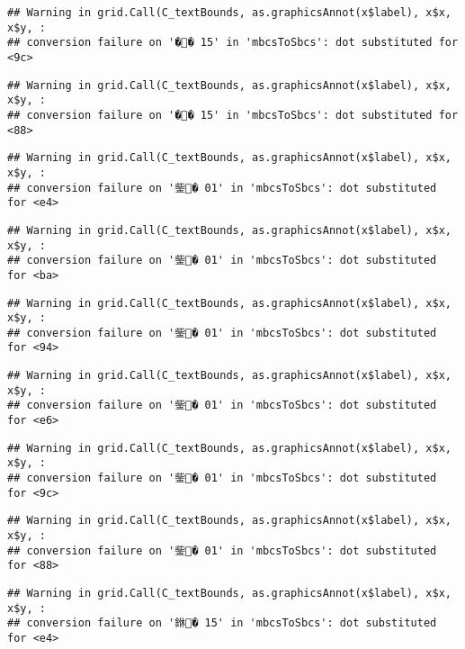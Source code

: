 \documentclass[]{article}
\begin{document}
\begin{verbatim}
## Warning in grid.Call(C_textBounds, as.graphicsAnnot(x$label), x$x, x$y, :
## conversion failure on '�� 15' in 'mbcsToSbcs': dot substituted for <9c>
\end{verbatim}

\begin{verbatim}
## Warning in grid.Call(C_textBounds, as.graphicsAnnot(x$label), x$x, x$y, :
## conversion failure on '�� 15' in 'mbcsToSbcs': dot substituted for <88>
\end{verbatim}

\begin{verbatim}
## Warning in grid.Call(C_textBounds, as.graphicsAnnot(x$label), x$x, x$y, :
## conversion failure on '鈭� 01' in 'mbcsToSbcs': dot substituted for <e4>
\end{verbatim}

\begin{verbatim}
## Warning in grid.Call(C_textBounds, as.graphicsAnnot(x$label), x$x, x$y, :
## conversion failure on '鈭� 01' in 'mbcsToSbcs': dot substituted for <ba>
\end{verbatim}

\begin{verbatim}
## Warning in grid.Call(C_textBounds, as.graphicsAnnot(x$label), x$x, x$y, :
## conversion failure on '鈭� 01' in 'mbcsToSbcs': dot substituted for <94>
\end{verbatim}

\begin{verbatim}
## Warning in grid.Call(C_textBounds, as.graphicsAnnot(x$label), x$x, x$y, :
## conversion failure on '鈭� 01' in 'mbcsToSbcs': dot substituted for <e6>
\end{verbatim}

\begin{verbatim}
## Warning in grid.Call(C_textBounds, as.graphicsAnnot(x$label), x$x, x$y, :
## conversion failure on '鈭� 01' in 'mbcsToSbcs': dot substituted for <9c>
\end{verbatim}

\begin{verbatim}
## Warning in grid.Call(C_textBounds, as.graphicsAnnot(x$label), x$x, x$y, :
## conversion failure on '鈭� 01' in 'mbcsToSbcs': dot substituted for <88>
\end{verbatim}

\begin{verbatim}
## Warning in grid.Call(C_textBounds, as.graphicsAnnot(x$label), x$x, x$y, :
## conversion failure on '銝� 15' in 'mbcsToSbcs': dot substituted for <e4>
\end{verbatim}
\end{document}
